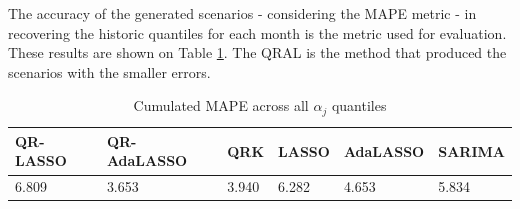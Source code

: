 The accuracy of the generated scenarios - considering the MAPE metric - in recovering the historic quantiles for each month is the metric used for evaluation. These results are shown on Table \ref{tab:results-icaraizinho}. The QRAL is the method that produced the scenarios with the smaller errors.

\begin{table}[h]
\centering
\caption{Cumulated MAPE across all $\alpha_j$ quantiles}
\label{tab:results-icaraizinho}
\begin{tabular}{@{}llllll@{}}
\toprule
QR-LASSO & QR-AdaLASSO & QRK   & LASSO & AdaLASSO & SARIMA \\ \midrule
6.809    & 3.653       & 3.940 & 6.282 & 4.653    & 5.834 
\end{tabular}
\end{table}
